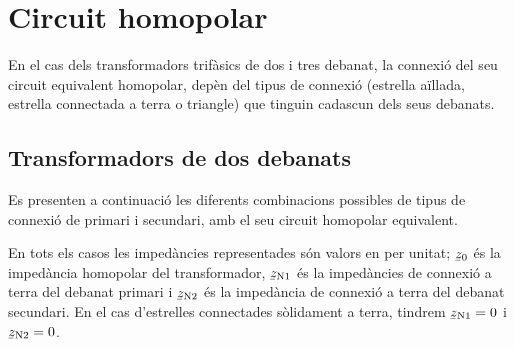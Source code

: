 \section{Circuit homopolar}\label{sec:circuit_homopolar}

En el cas dels transformadors trifàsics de dos i tres debanat, la connexió del seu circuit equivalent homopolar, depèn del tipus de connexió (estrella aïllada, estrella connectada a terra o triangle) que tinguin cadascun dels seus debanats.

\subsection{Transformadors de dos debanats}\label{sec:cir-hom-2-deb}

Es presenten a continuació les diferents combinacions possibles de tipus de connexió de primari i secundari, amb el seu circuit homopolar equivalent.

En tots els casos les impedàncies representades són valors en per unitat; $\cmplx{z}_0$ és la impedància homopolar del transformador, $\cmplx{z}\ped{N1}$ és la impedàncies de connexió a terra del debanat primari i $\cmplx{z}\ped{N2}$ és  la impedància de connexió a terra del debanat secundari. En el cas d'estrelles connectades sòlidament a terra, tindrem $\cmplx{z}\ped{N1}=0$ i $\cmplx{z}\ped{N2}=0$.

\begin{center}
    
\end{center}

\begin{center}
    
\end{center}

\begin{center}
    
\end{center}

\begin{center}
    
\end{center}

